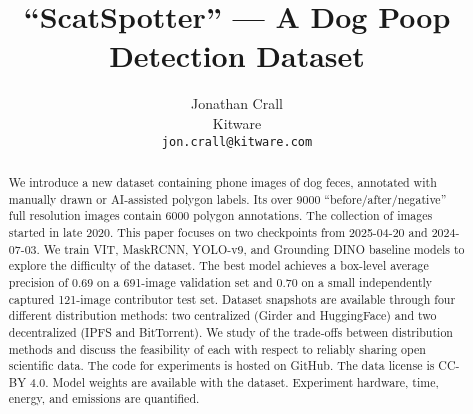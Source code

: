 \documentclass{article}
\title{``ScatSpotter'' --- A Dog Poop Detection Dataset}
\author{Jonathan Crall\\
Kitware\\
\texttt{jon.crall@kitware.com} \\
}
\newif\ifuseappendix
\begin{document}
\maketitle

\begin{abstract}


We introduce a new dataset containing phone images of dog feces, annotated with manually drawn or AI-assisted polygon labels.  Its over 9000 ``before/after/negative'' full resolution images contain 6000 polygon annotations.  The collection of images started in late 2020.  This paper focuses on two checkpoints from 2025-04-20 and 2024-07-03.  We train VIT, MaskRCNN, YOLO-v9, and Grounding DINO baseline models to explore the difficulty of the dataset.  The best model achieves a box-level average precision of 0.69 on a 691-image validation set and 0.70 on a small independently captured 121-image contributor test set.  Dataset snapshots are available through four different distribution methods: two centralized (Girder and HuggingFace) and two decentralized (IPFS and BitTorrent).  We study of the trade-offs between distribution methods and discuss the feasibility of each with respect to reliably sharing open scientific data.  The code for experiments is hosted on GitHub.  The data license is CC-BY 4.0.  Model weights are available with the dataset.  Experiment hardware, time, energy, and emissions are quantified.


\end{abstract}





\FloatBarrier



{\small


}


\ifuseappendix

%
\fi
\end{document}
